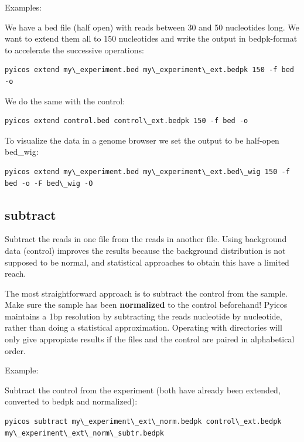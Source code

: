 \documentclass[letterpaper,10pt,english]{sphinxmanual}
\begin{document}
Examples:

We have a bed file (half open) with reads between 30 and 50 nucleotides long. We want to extend them all to 150 nucleotides and write the output in bedpk-format to accelerate the successive operations:

\begin{Verbatim}[commandchars=\\\{\}]
pyicos extend my\_experiment.bed my\_experiment\_ext.bedpk 150 -f bed -o
\end{Verbatim}

We do the same with the control:

\begin{Verbatim}[commandchars=\\\{\}]
pyicos extend control.bed control\_ext.bedpk 150 -f bed -o
\end{Verbatim}

To visualize the data in a genome browser we set the output to be half-open bed\_wig:

\begin{Verbatim}[commandchars=\\\{\}]
pyicos extend my\_experiment.bed my\_experiment\_ext.bed\_wig 150 -f bed -o -F bed\_wig -O
\end{Verbatim}


\subsection{subtract}
\label{pyicos:subtract}
Subtract the reads in one file from the reads in another file. Using background data (control) improves the results because the background distribution is not supposed to be normal,
and statistical approaches to obtain this have a limited reach.

The most straightforward approach is to subtract the control from the sample. Make sure the sample has been \textbf{normalized} to the control beforehand!
Pyicos maintains a 1bp resolution by subtracting the reads nucleotide by nucleotide, rather than doing a statistical approximation.
Operating with directories will only give appropiate results if the files and the control are paired in alphabetical order.

Example:

Subtract the control from the experiment (both have already been extended, converted to bedpk and normalized):

\begin{Verbatim}[commandchars=\\\{\}]
pyicos subtract my\_experiment\_ext\_norm.bedpk control\_ext.bedpk my\_experiment\_ext\_norm\_subtr.bedpk
\end{Verbatim}
\end{document}

